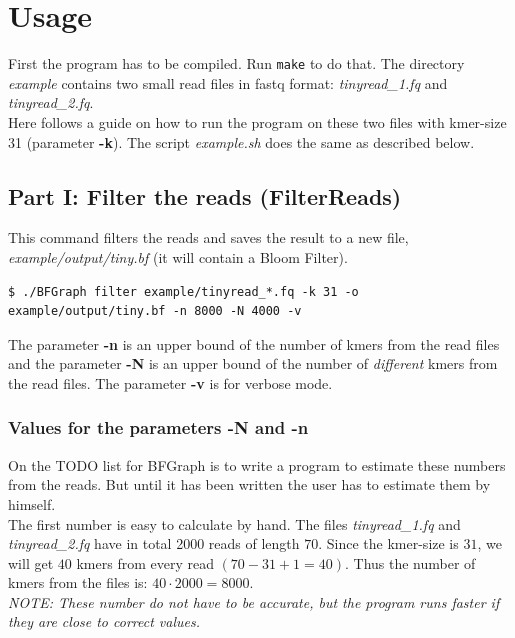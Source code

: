 \documentclass[a4paper]{report}
\renewcommand{\b}[1]{\textbf{#1}}  %
\newcommand{\e}[1]{\emph{#1}}    %
\begin{document}
\chapter{Usage}
First the program has to be compiled. Run {\verb `make` } to do that.
The directory \e{example} contains two small  read files in fastq format: 
\e{tinyread\_1.fq} and \e{tinyread\_2.fq}.\\[4pt]

Here follows a guide on how to run the program on these two files with kmer-size 31 (parameter \b{-k}).
The script \e{example.sh} does the same as described below.

\section{Part I: Filter the reads (FilterReads)}
This command filters the reads and saves the result to a new file, \e{example/output/tiny.bf} (it will contain a Bloom Filter).
\begin{verbatim}
$ ./BFGraph filter example/tinyread_*.fq -k 31 -o example/output/tiny.bf -n 8000 -N 4000 -v
\end{verbatim}

The parameter \b{-n} is an upper bound of the number of kmers from the read files and the parameter \b{-N} is an upper bound
of the number of \textit{different} kmers from the read files. The parameter \b{-v} is for verbose mode.\\[4pt]

\subsection{Values for the parameters \b{-N} and \b{-n}}  %
On the TODO list for BFGraph is to write a program to estimate these numbers from the reads. But until it has been written the user has to estimate
them by himself. \\[4pt]

The first number is easy to calculate by hand. The files \e{tinyread\_1.fq} and \e{tinyread\_2.fq} have in total 2000 reads of length $70$.
Since the kmer-size is $31$, we will get $40$ kmers from every read $(70 - 31 + 1=40)$. Thus the number of kmers from the files
is: $40\cdot 2000=8000$. \\[4pt]

\textit{NOTE: These number do not have to be accurate, but the program runs faster if they are close to correct values.} \\[4pt]
\end{document}
